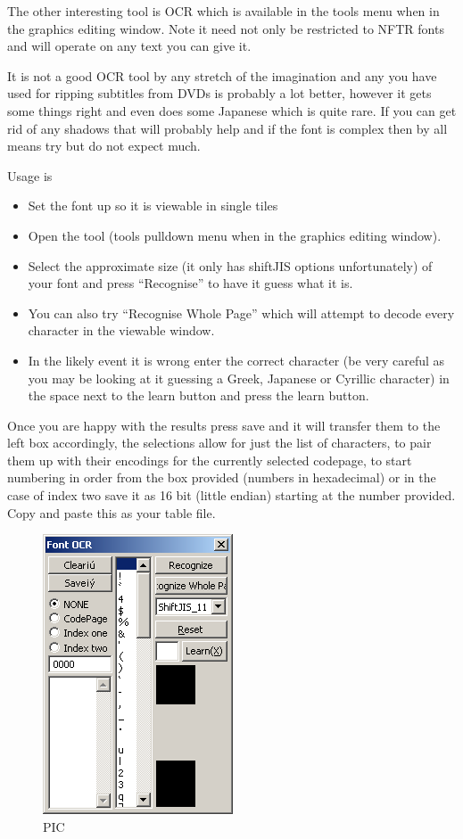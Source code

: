 \documentclass[
]{book}
\providecommand{\tightlist}{%
  \setlength{\itemsep}{0pt}\setlength{\parskip}{0pt}}
\begin{document}
The other interesting tool is OCR which is available in the tools menu when in the graphics editing window. Note it need not only be restricted to NFTR fonts and will operate on any text you can give it.

It is not a good OCR tool by any stretch of the imagination and any you have used for ripping subtitles from DVDs is probably a lot better, however it gets some things right and even does some Japanese which is quite rare. If you can get rid of any shadows that will probably help and if the font is complex then by all means try but do not expect much.

Usage is

\begin{itemize}
\tightlist
\item
  Set the font up so it is viewable in single tiles
\item
  Open the tool (tools pulldown menu when in the graphics editing window).
\item
  Select the approximate size (it only has shiftJIS options unfortunately) of your font and press ``Recognise'' to have it guess what it is.
\item
  You can also try ``Recognise Whole Page'' which will attempt to decode every character in the viewable window.
\item
  In the likely event it is wrong enter the correct character (be very careful as you may be looking at it guessing a Greek, Japanese or Cyrillic character) in the space next to the learn button and press the learn button.
\end{itemize}

Once you are happy with the results press save and it will transfer them to the left box accordingly, the selections allow for just the list of characters, to pair them up with their encodings for the currently selected codepage, to start numbering in order from the box provided (numbers in hexadecimal) or in the case of index two save it as 16 bit (little endian) starting at the number provided. Copy and paste this as your table file.

\begin{figure}
\centering
\includegraphics{images/113_home_fast6191_romhackingguide_unrenamed_fil___rders_romhackingguidefontnftrcrystaltile2_4.png}
\caption{PIC}
\end{figure}
\end{document}
